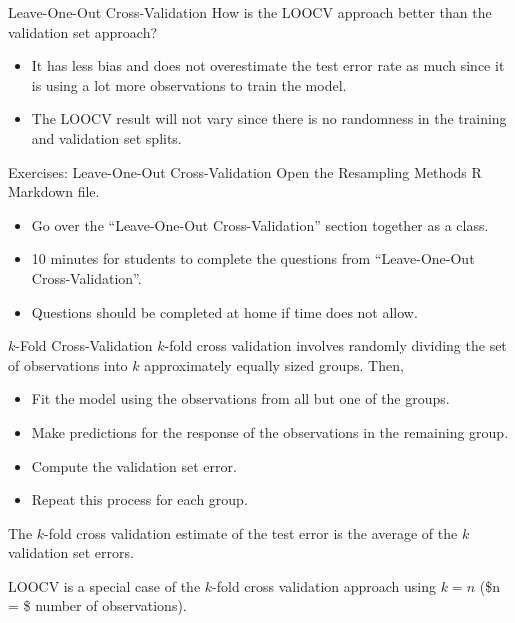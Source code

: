 \documentclass[
  ignorenonframetext,
  aspectratio=169,
]{beamer}
\begin{document}
\begin{frame}{Leave-One-Out Cross-Validation}
\protect\hypertarget{leave-one-out-cross-validation-1}{}
How is the LOOCV approach better than the validation set approach?

\begin{itemize}
\item
  It has \alert{less bias} and
  \alert{does not overestimate the test error rate} as much since it is
  using a lot more observations to train the model.
\item
  The LOOCV result will not vary since there is no randomness in the
  training and validation set splits.
\end{itemize}
\end{frame}

\begin{frame}{Exercises: Leave-One-Out Cross-Validation}
\protect\hypertarget{exercises-leave-one-out-cross-validation}{}
Open the Resampling Methods R Markdown file.

\begin{itemize}
\item
  Go over the ``Leave-One-Out Cross-Validation'' section together as a
  class.
\item
  10 minutes for students to complete the questions from ``Leave-One-Out
  Cross-Validation''.
\item
  Questions should be completed at home if time does not allow.
\end{itemize}
\end{frame}

\begin{frame}{\(k\)-Fold Cross-Validation}
\protect\hypertarget{k-fold-cross-validation}{}
\(k\)-fold cross validation involves randomly dividing the set of
observations into \(k\) approximately equally sized groups. Then,

\begin{itemize}
\item
  Fit the model using the observations from all but one of the groups.
\item
  Make predictions for the response of the observations in the remaining
  group.
\item
  Compute the validation set error.
\item
  Repeat this process for each group.
\end{itemize}

The \(k\)-fold cross validation estimate of the test error is the
average of the \(k\) validation set errors.

LOOCV is a special case of the \(k\)-fold cross validation approach
using \(k = n\) (\$n = \$ number of observations).
\end{frame}
\end{document}
